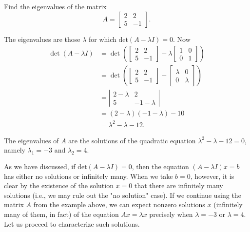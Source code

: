 \begin{example}
    Find the eigenvalues of the matrix \[ A = \begin{bmatrix} 2 & 2 \\ 5 & -1 \end{bmatrix}. \]

The eigenvalues are those \( \lambda \) for which \( \text{det}(A - \lambda I) = 0 \). Now 
$$
\begin{aligned}
\operatorname{det}({A}-\lambda {I}) & =\operatorname{det}\left(\left[\begin{array}{cc}
2 & 2 \\
5 & -1
\end{array}\right]-\lambda\left[\begin{array}{ll}
1 & 0 \\
0 & 1
\end{array}\right]\right) \\
& =\operatorname{det}\left(\left[\begin{array}{cc}
2 & 2 \\
5 & -1
\end{array}\right]-\left[\begin{array}{cc}
\lambda & 0 \\
0 & \lambda
\end{array}\right]\right) \\
& =\left|\begin{array}{cc}
2-\lambda & 2 \\
5 & -1-\lambda
\end{array}\right| \\
& =(2-\lambda)(-1-\lambda)-10 \\
& =\lambda^2-\lambda-12 .
\end{aligned}
$$



The eigenvalues of \( A \) are the solutions of the quadratic equation \( \lambda^2 - \lambda - 12 = 0 \), namely \( \lambda_1 = -3 \) and \( \lambda_2 = 4 \).

As we have discussed, if \( \text{det}(A - \lambda I) = 0 \), then the equation \( (A - \lambda I)x = b \) has either no solutions or infinitely many. When we take \( b = 0 \), however, it is clear by the existence of the solution \( x = 0 \) that there are infinitely many solutions (i.e., we may rule out the "no solution" case). If we continue using the matrix \( A \) from the example above, we can expect nonzero solutions \( x \) (infinitely many of them, in fact) of the equation \( Ax = \lambda x \) precisely when \( \lambda = -3 \) or \( \lambda = 4 \). Let us proceed to characterize such solutions.


\end{example}
